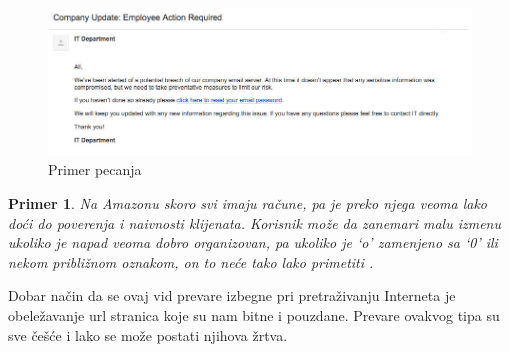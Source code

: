 \documentclass[a4paper]{article}
\newtheorem{primer}{Primer}[section]
\begin{document}
\begin{figure}[h!]
\begin{center}
\includegraphics[scale=0.4]{msnr_phishing.jpg}
\end{center}
\caption{Primer pecanja }
\label{fig:phishing}
\end{figure}

\begin{primer}
Na Amazonu skoro svi imaju račune, pa je preko njega veoma lako doći do poverenja i naivnosti klijenata. Korisnik može da zanemari malu izmenu ukoliko je napad veoma dobro organizovan, pa ukoliko je ‘o’ zamenjeno sa ‘0’ ili nekom približnom oznakom, on to neće tako lako primetiti \cite{6exp}.
\end{primer}

Dobar način da se ovaj vid prevare izbegne pri pretraživanju Interneta je obeležavanje url stranica koje su nam bitne i pouzdane. Prevare ovakvog tipa su sve češće i lako se može postati njihova žrtva.
\end{document}
